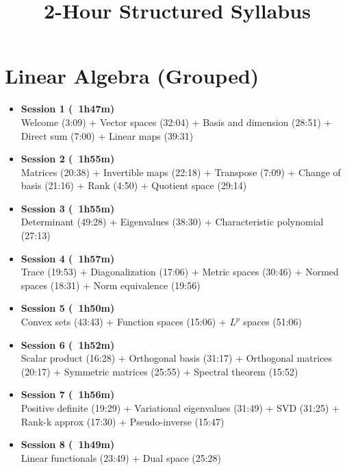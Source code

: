 \documentclass{article}
\title{2-Hour Structured Syllabus}
\date{}
\begin{document}
\maketitle

\section*{Linear Algebra (Grouped)}

\begin{itemize}
\item \textbf{Session 1 (~1h47m)}\\
Welcome (3:09) + Vector spaces (32:04) + Basis and dimension (28:51) + Direct sum (7:00) + Linear maps (39:31)

\item \textbf{Session 2 (~1h55m)}\\
Matrices (20:38) + Invertible maps (22:18) + Transpose (7:09) + Change of basis (21:16) + Rank (4:50) + Quotient space (29:14)

\item \textbf{Session 3 (~1h55m)}\\
Determinant (49:28) + Eigenvalues (38:30) + Characteristic polynomial (27:13)

\item \textbf{Session 4 (~1h57m)}\\
Trace (19:53) + Diagonalization (17:06) + Metric spaces (30:46) + Normed spaces (18:31) + Norm equivalence (19:56)

\item \textbf{Session 5 (~1h50m)}\\
Convex sets (43:43) + Function spaces (15:06) + $L^p$ spaces (51:06)

\item \textbf{Session 6 (~1h52m)}\\
Scalar product (16:28) + Orthogonal basis (31:17) + Orthogonal matrices (20:17) + Symmetric matrices (25:55) + Spectral theorem (15:52)

\item \textbf{Session 7 (~1h56m)}\\
Positive definite (19:29) + Variational eigenvalues (31:49) + SVD (31:25) + Rank-k approx (17:30) + Pseudo-inverse (15:47)

\item \textbf{Session 8 (~1h49m)}\\
Linear functionals (23:49) + Dual space (25:28)
\end{itemize}
\end{document}
